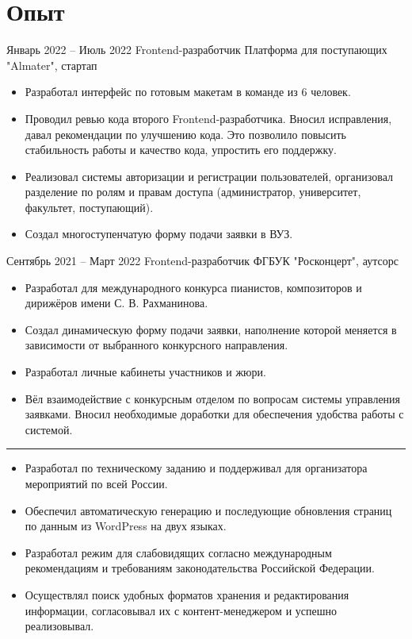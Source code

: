 \section*{Опыт}

\experience
{Январь 2022 -- Июль 2022}
{Frontend-разработчик}
{Платформа для поступающих "Almater", стартап}
{\begin{itemize}
    \item Разработал интерфейс по готовым макетам в команде из 6 человек.
    \item Проводил ревью кода второго Frontend-разработчика. Вносил исправления, давал рекомендации по улучшению кода. Это позволило повысить стабильность работы и качество кода, упростить его поддержку.
    \item Реализовал системы авторизации и регистрации пользователей, организовал разделение по ролям и правам доступа (администратор, университет, факультет, поступающий).
    \item Создал многоступенчатую форму подачи заявки в ВУЗ.
\end{itemize}}

\experience
{Сентябрь 2021 -- Март 2022}
{Frontend-разработчик}
{ФГБУК "Росконцерт", аутсорс}
{\begin{itemize}
    \item Разработал  для международного конкурса пианистов, композиторов и дирижёров имени С. В. Рахманинова.
    \item Создал динамическую форму подачи заявки, наполнение которой меняется в зависимости от выбранного конкурсного направления. 
    \item Разработал личные кабинеты участников и жюри.
    \item Вёл взаимодействие с конкурсным отделом по вопросам системы управления заявками. Вносил необходимые доработки для обеспечения удобства работы с системой.
\end{itemize}
{\color{lightgray}\hrule}
\vspace{-.5em}
\begin{itemize}
    \item Разработал по техническому заданию и поддерживал  для организатора мероприятий по всей России.
    \item Обеспечил автоматическую генерацию и последующие обновления страниц по данным из WordPress на двух языках.
    \item Разработал режим для слабовидящих согласно международным рекомендациям и требованиям законодательства Российской Федерации.
    \item Осуществлял поиск удобных форматов хранения и редактирования информации, согласовывал их с контент-менеджером и успешно реализовывал.
\end{itemize}}

